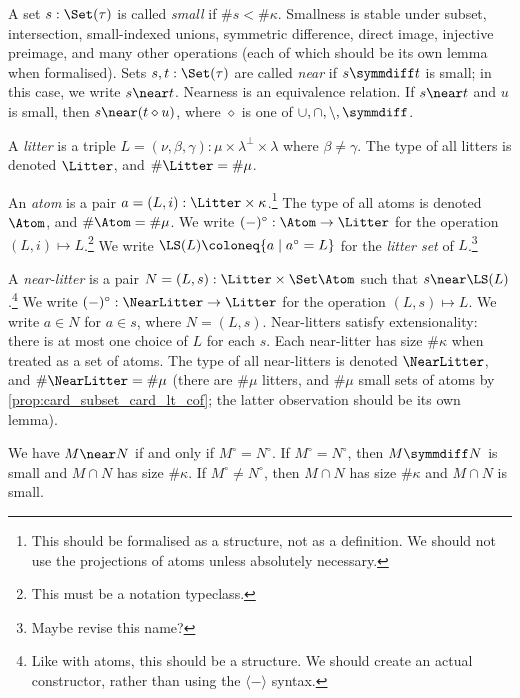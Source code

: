 \begin{definition}[small]
  \label{def:Small}
  \leanok
  A set \( s : \Set(\tau) \) is called \emph{small} if \( \#s < \#\kappa \).
  Smallness is stable under subset, intersection, small-indexed unions, symmetric difference, direct image, injective preimage, and many other operations (each of which should be its own lemma when formalised).
  Sets \( s, t : \Set(\tau) \) are called \emph{near} if \( s \symmdiff t \) is small; in this case, we write \( s \near t \).
  Nearness is an equivalence relation.
  If \( s \near t \) and \( u \) is small, then \( s \near (t \mathbin{\diamond} u) \), where \( \diamond \) is one of \( \cup, \cap, \setminus, \symmdiff \).
\end{definition}
\begin{definition}[litter]
  \label{def:Litter}
  \leanok
  A \emph{litter} is a triple \( L = (\nu, \beta, \gamma) : \mu \times \lambda^\bot \times \lambda \) where \( \beta \neq \gamma \).
  The type of all litters is denoted \( \Litter \), and \( \#\Litter = \#\mu \).
\end{definition}
\begin{definition}[atom]
  \label{def:Atom}
  \leanok
  An \emph{atom} is a pair \( a = (L, i) : \Litter \times \kappa \).\footnote{This should be formalised as a structure, not as a definition. We should not use the projections of atoms unless absolutely necessary.}
  The type of all atoms is denoted \( \Atom \), and \( \#\Atom = \#\mu \).
  We write \( (-)^\circ : \Atom \to \Litter \) for the operation \( (L, i) \mapsto L \).\footnote{This must be a notation typeclass.}
  We write \( \LS(L) \coloneq \{ a \mid a^\circ = L \} \) for the \emph{litter set} of \( L \).\footnote{Maybe revise this name?}
\end{definition}
\begin{definition}
  \label{def:NearLitter}
  \leanok
  A \emph{near-litter} is a pair \( N = (L, s) : \Litter \times \Set \Atom \) such that \( s \near \LS(L) \).\footnote{Like with atoms, this should be a structure. We should create an actual constructor, rather than using the \( \langle - \rangle \) syntax.}
  We write \( (-)^\circ : \NearLitter \to \Litter \) for the operation \( (L, s) \mapsto L \).
  We write \( a \in N \) for \( a \in s \), where \( N = (L, s) \).
  Near-litters satisfy extensionality: there is at most one choice of \( L \) for each \( s \).
  Each near-litter has size \( \#\kappa \) when treated as a set of atoms.
  The type of all near-litters is denoted \( \NearLitter \), and \( \#\NearLitter = \#\mu \) (there are \( \#\mu \) litters, and \( \#\mu \) small sets of atoms by \cref{prop:card_subset_card_lt_cof}; the latter observation should be its own lemma).

  We have \( M \near N \) if and only if \( M^\circ = N^\circ \).
  If \( M^\circ = N^\circ \), then \( M \symmdiff N \) is small and \( M \cap N \) has size \( \#\kappa \).
  If \( M^\circ \neq N^\circ \), then \( M \cap N \) has size \( \#\kappa \) and \( M \cap N \) is small.
\end{definition}
